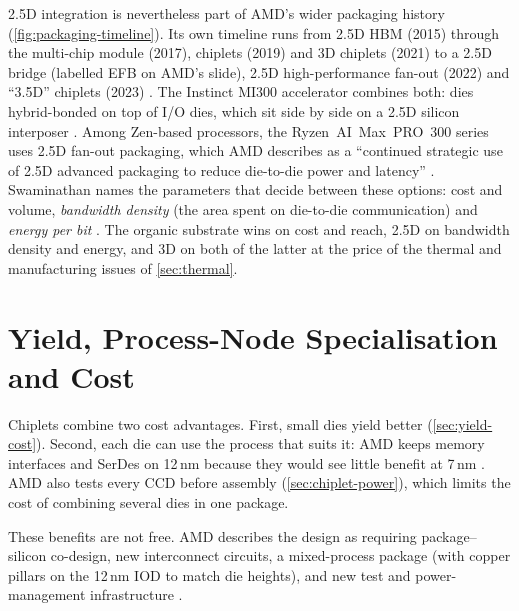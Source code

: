 2.5D integration is nevertheless part of AMD's wider packaging history (\cref{fig:packaging-timeline}). Its own timeline runs from 2.5D HBM (2015) through the multi-chip module (2017), chiplets (2019) and 3D chiplets (2021) to a 2.5D bridge (labelled EFB on AMD's slide), 2.5D high-performance fan-out (2022) and ``3.5D'' chiplets (2023) \cite[slide~5]{lambertHeterogenousIntegrationHigh2025}. The Instinct MI300 accelerator combines both: dies hybrid-bonded on top of I/O dies, which sit side by side on a 2.5D silicon interposer \cite[slide~10]{lambertHeterogenousIntegrationHigh2025}. Among Zen-based processors, the Ryzen~AI~Max~PRO~300 series uses 2.5D fan-out packaging, which AMD describes as a ``continued strategic use of 2.5D advanced packaging to reduce die-to-die power and latency'' \cite[slide~8]{lambertHeterogenousIntegrationHigh2025}. Swaminathan names the parameters that decide between these options: cost and volume, \emph{bandwidth density} (the area spent on die-to-die communication) and \emph{energy per bit} \cite[slide~7]{swaminathanAdvancedPackagingEnabling2021}. The organic substrate wins on cost and reach, 2.5D on bandwidth density and energy, and 3D on both of the latter at the price of the thermal and manufacturing issues of \cref{sec:thermal}.

\section{Yield, Process-Node Specialisation and Cost}
\label{sec:process-specialisation}

Chiplets combine two cost advantages. First, small dies yield better (\cref{sec:yield-cost}). Second, each die can use the process that suits it: AMD keeps memory interfaces and SerDes on 12\,nm because they would see little benefit at 7\,nm \cite{naffziger2020chiplet}. AMD also tests every CCD before assembly (\cref{sec:chiplet-power}), which limits the cost of combining several dies in one package.

These benefits are not free. AMD describes the design as requiring package--silicon co-design, new interconnect circuits, a mixed-process package (with copper pillars on the 12\,nm IOD to match die heights), and new test and power-management infrastructure \cite{naffziger2020chiplet}.


